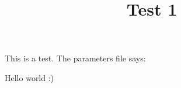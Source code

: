 \documentclass{report}
\title{Test 1}
\begin{document}
\sloppy

This is a test. The parameters file says: 

Hello world :)
\end{document}
